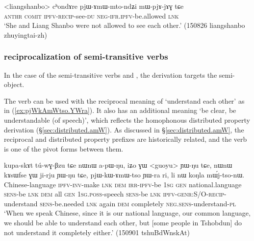 \begin{exe}
\ex \label{ex:pjAmWmtondZi}
\gll <liangshanbo> cʰondɤre pjɯ-ɤmɯ-mto-ndʑi mɯ-pjɤ-jɤɣ tɕe \\
\textsc{anthr} \textsc{comit} \textsc{ipfv}-\textsc{recip}-see-\textsc{du} \textsc{neg}-\textsc{ifr}.\textsc{ipfv}-be.allowed \textsc{lnk} \\
\glt `She and Liang Shanbo were not allowed to see each other.' (150826 liangshanbo zhuyingtai-zh) 
\end{exe}


\subsubsection{ reciprocalization of semi-transitive verbs}
In the case of the semi-transitive verbs  and , the  derivation targets the semi-object.

The verb  can be used with the reciprocal meaning of `understand each other' as in (\ref{ex:pjWkAmWtso.YWra}). It also has an additional meaning `be clear, be understandable (of speech)', which reflects the homophonous  distributed property derivation (§\ref{sec:distributed.amW}). As discussed in §\ref{sec:distributed.amW}, the reciprocal and distributed property  prefixes are historically related, and the verb  is one of the pivot forms between them.

\begin{exe}
\ex \label{ex:pjWkAmWtso.YWra}
 \gll kupa-skɤt tú-wɣ-βzu tɕe nɯnɯ a-pɯ-ŋu, iʑo ɣɯ <guoyu> ɲɯ-ŋu tɕe, nɯnɯ kɤsɯfse ɣɯ ji-rju ɲɯ-ŋu tɕe, pjɯ-kɯ-ɤmɯ-tso ɲɯ-ra ri, li nɯ koŋla mɯ́j-tso-nɯ. \\
 Chinese-language \textsc{ipfv}-\textsc{inv}-make \textsc{lnk} \textsc{dem} \textsc{irr}-\textsc{ipfv}-be \textsc{1sg} \textsc{gen} national.language \textsc{sens}-be \textsc{lnk} \textsc{dem} all \textsc{gen} \textsc{1sg}.\textsc{poss}-speech \textsc{sens}-be \textsc{lnk} \textsc{ipfv}-\textsc{genr}:S/O-\textsc{recip}-understand \textsc{sens}-be.needed \textsc{lnk} again \textsc{dem} completely \textsc{neg}.\textsc{sens}-understand-\textsc{pl} \\
\glt `When we speak Chinese, since it is our national language, our common language, we should be able to understand each other, but [some people in Tshobdun] do not understand it completely either.' (150901 tshuBdWnskAt)
\end{exe}

